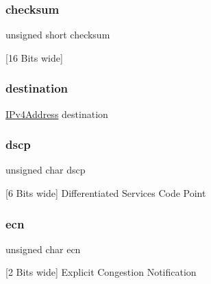 \subsubsection{\texorpdfstring{checksum}{checksum}}
{\footnotesize\ttfamily unsigned short checksum}



\mbox{[}16 Bits wide\mbox{]} 

\mbox{\label{structipv4_header___a3eb32496d9688dd666653f0093f99081}} 
\subsubsection{\texorpdfstring{destination}{destination}}
{\footnotesize\ttfamily \mbox{\hyperlink{group__ipv4_gac3530474aec32033cd4709abdc7bded7}{I\+Pv4\+Address}} destination}

\mbox{\label{structipv4_header___a73505d600361f7cfce789106f3eb854d}} 
\subsubsection{\texorpdfstring{dscp}{dscp}}
{\footnotesize\ttfamily unsigned char dscp}



\mbox{[}6 Bits wide\mbox{]} Differentiated Services Code Point 

\mbox{\label{structipv4_header___a6420d8488de5bd7f6523763e1bb5b278}} 
\subsubsection{\texorpdfstring{ecn}{ecn}}
{\footnotesize\ttfamily unsigned char ecn}



\mbox{[}2 Bits wide\mbox{]} Explicit Congestion Notification 

\mbox{\label{structipv4_header___a78ac89a4a0f57ffa7c2ecf31749aa390}} 
